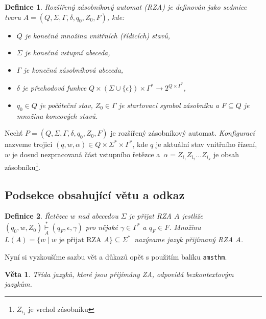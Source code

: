 \documentclass[11pt, twocolumn, a4paper]{article}
\newtheorem{definice}{Definice}
\newtheorem{veta}{Věta}
\begin{document}
\begin{definice} \label{def:def_1}
\emph{Rozšířený zásobníkový automat} (RZA) je definován jako sedmice tvaru $A = (Q, \Sigma, \Gamma, \delta , q_0, Z_0, F)$, kde:

\begin{itemize}[leftmargin=0.8cm]
    \item $Q$ je konečná množina \emph{vnitřních (řídicích) stavů},
    
    \item $\Sigma$ je konečná \emph{vstupní abeceda},
    
    \item $\Gamma$ je konečná \emph{zásobníková abeceda},
    
    \item$\delta$ je \emph{přechodová funkce }$Q\times(\Sigma\cup\{\epsilon\})\times\Gamma^*\rightarrow{}2^{Q\times\Gamma^*}$,
    
    \item $q_0\in Q$ je \emph{počáteční stav}, $Z_0\in\Gamma$ je \emph{startovací symbol zásobníku a} $F\subseteq Q$ je množina \emph{koncových stavů}.

\end{itemize}
\end{definice}
\setlength{\parindent}{11pt}
Nechť $P = (Q, \Sigma, \Gamma, \delta, q_0, Z_0, F)$ je rozšířený zásobníkový automat. \emph{Konfigurací} nazveme trojici $(q, w, \alpha)\in Q\times\Sigma^*\times\Gamma^*$, kde $q$ je aktuální stav vnitřního řízení, $w$ je dosud nezpracovaná část vstupního řetězce a~$\alpha = Z_{i_1}Z_{i_2}\ldots Z_{i_k}$ je obsah zásobníku\footnote{$Z_{i_1}$ je vrchol zásobníku}.

\subsection{Podsekce obsahující větu a odkaz} \begin{definice} \label{def:def_2} \emph{Řetězec} $w$ \emph{nad abecedou $\Sigma$ je přijat RZA} $A$ jestliže $(q_0, w, Z_0)\underset{A}{\overset{*}{\vdash}}(q_F, \epsilon, \gamma)$ pro nějaké $\gamma\in\Gamma^*$ a $q_F\!\in\!F$. Množinu $L(A) = \{w\mid w\text{ je přijat RZA } A \text{\}} \subseteq \Sigma^*$~nazývame \emph{jazyk přijímaný RZA} $A$.
\end{definice}

\setlength{\parindent}{11pt}
Nyní si vyzkoušíme sazbu vět a důkazů opět s použitím
balíku \verb|amsthm|.

\begin{veta}
Třída jazyků, které jsou přijímány ZA, odpovídá
\emph{bezkontextovým jazykům}.
\end{veta}
\end{document}
